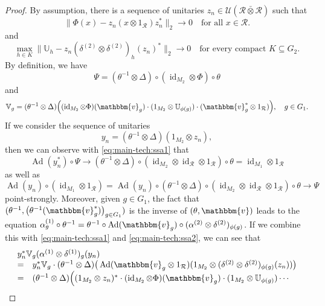 \documentclass[11pt,a4paper]{article}
\theoremstyle{definition}
\theoremstyle{remark}
\numberwithin{equation}{section}
\numberwithin{theorem}{section}
\begin{document}
\begin{proof}
By assumption, there is a sequence of unitaries $z_n\in\mathcal{U}(\mathcal{R}\bar{\otimes}\mathcal{R})$ such that 
\begin{equation} \label{eq:main-tech:ssa1}
\|\Phi(x) - z_n(x\otimes 1_{\mathcal R})z_n^*\|_2\to 0\quad\text{for all } x\in\mathcal R.
\end{equation}
and 
\begin{equation} \label{eq:main-tech:ssa2}
\max_{h\in K} \|\mathbb{U}_h - z_n(\delta^{(2)}\otimes\delta^{(2)})_h(z_n)^*\|_2\to 0 \quad\text{for every compact } K\subseteq G_2.
\end{equation}
%
By definition, we have
\[
\Psi = (\theta^{-1}\otimes\Delta)\circ (\operatorname{id}_{M_2}\otimes\Phi)\circ\theta
\]
and
\[
\mathbb{V}_g = ({\theta}^{-1}\otimes\Delta)\Big( (\operatorname{id}_{M_2}\otimes\Phi)(\mathbbm{v}_g) \cdot (1_{M_2}\otimes \mathbb{U}_{\phi(g)})\cdot (\mathbbm{v}_g^* \otimes 1_{\mathcal R}) \Big),\quad g\in G_1.
\]
If we consider the sequence of unitaries 
\[
y_n=(\theta^{-1}\otimes\Delta)(1_{M_2}\otimes z_n),
\]
then we can observe with \eqref{eq:main-tech:ssa1} that
\[
\operatorname{Ad}(y_n^*)\circ\Psi \to (\theta^{-1}\otimes\Delta)\circ (\operatorname{id}_{M_2}\otimes\operatorname{id}_{\mathcal R}\otimes 1_{\mathcal R})\circ\theta = \operatorname{id}_{M_1}\otimes 1_{\mathcal R}
\]
as well as
\[
\operatorname{Ad}(y_n)\circ(\operatorname{id}_{M_1}\otimes 1_{\mathcal R}) = \operatorname{Ad}(y_n)\circ(\theta^{-1}\otimes\Delta)\circ (\operatorname{id}_{M_2}\otimes\operatorname{id}_{\mathcal R}\otimes 1_{\mathcal R})\circ\theta \to \Psi
\]
point-strongly.
Moreover, given $g\in G_1$, the fact that $(\theta^{-1}, \big( \theta^{-1}(\mathbbm{v}^*_g) \big)_{g\in G_1} )$ is the inverse of $(\theta,\mathbbm{v})$ leads to the equation $\alpha^{(1)}_g\circ\theta^{-1}=\theta^{-1}\circ\operatorname{Ad}(\mathbbm{v}_g)\circ(\alpha^{(2)}\otimes\delta^{(2)})_{\phi(g)}$.
If we combine this with \eqref{eq:main-tech:ssa1} and \eqref{eq:main-tech:ssa2}, we can see that
\[
\begin{array}{cl}
\multicolumn{2}{l}{ y_n^*\mathbb{V}_g(\alpha^{(1)}\otimes\delta^{(1)})_g(y_n) } \\
=& y_n^*\mathbb{V}_g\cdot (\theta^{-1}\otimes\Delta)\big( \operatorname{Ad}(\mathbbm{v}_g\otimes 1_{\mathcal R})(1_{M_2}\otimes(\delta^{(2)}\otimes\delta^{(2)})_{\phi(g)}(z_n)) \big)  \\
=& (\theta^{-1}\otimes\Delta)\Big( (1_{M_2}\otimes z_n)^*\cdot (\operatorname{id}_{M_2}\otimes\Phi)(\mathbbm{v}_g) \cdot (1_{M_2}\otimes \mathbb{U}_{\phi(g)}) \cdots \\

\end{array}\]
\end{proof}
\end{document}

